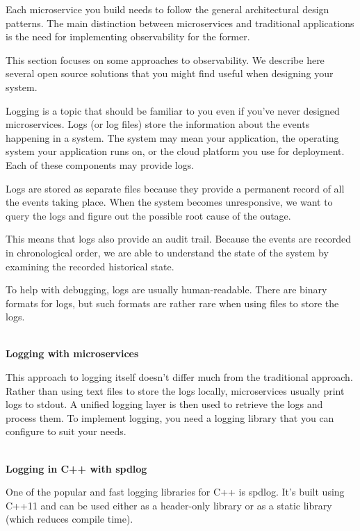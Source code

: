 
Each microservice you build needs to follow the general architectural design patterns. The main distinction between microservices and traditional applications is the need for implementing observability for the former.

This section focuses on some approaches to observability. We describe here several open source solutions that you might find useful when designing your system.


Logging is a topic that should be familiar to you even if you've never designed microservices. Logs (or log files) store the information about the events happening in a system. The system may mean your application, the operating system your application runs on, or the cloud platform you use for deployment. Each of these components may provide logs.

Logs are stored as separate files because they provide a permanent record of all the events taking place. When the system becomes unresponsive, we want to query the logs and figure out the possible root cause of the outage.

This means that logs also provide an audit trail. Because the events are recorded in chronological order, we are able to understand the state of the system by examining the recorded historical state.

To help with debugging, logs are usually human-readable. There are binary formats for logs, but such formats are rather rare when using files to store the logs.

\hspace*{\fill} \\ %
\noindent
\textbf{Logging with microservices}

This approach to logging itself doesn't differ much from the traditional approach. Rather than using text files to store the logs locally, microservices usually print logs to stdout. A unified logging layer is then used to retrieve the logs and process them. To implement logging, you need a logging library that you can configure to suit your needs.

\hspace*{\fill} \\ %
\noindent
\textbf{Logging in C++ with spdlog}

One of the popular and fast logging libraries for C++ is spdlog. It's built using C++11 and can be used either as a header-only library or as a static library (which reduces compile time).

